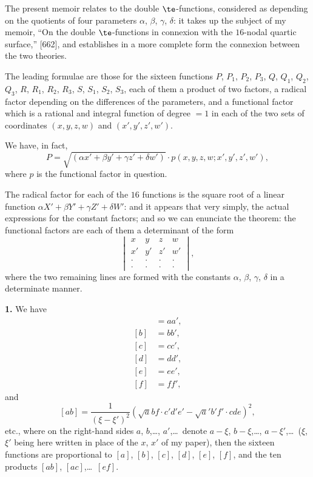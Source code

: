 \documentclass[11pt,a4paper]{book}
\begin{document}
\medskip

The present memoir relates to the double $\te$-functions, considered as depending on the quotients of four parameters $\alpha$, $\beta$, $\gamma$, $\delta$: it takes up the subject of my memoir, ``On the double $\te$-functions in connexion with the $16$-nodal quartic surface,'' [662], and establishes in a more complete form the connexion between the two theories.

The leading formulae are those for the sixteen functions $P$, $P_1$, $P_2$, $P_3$, $Q$, $Q_1$, $Q_2$, $Q_3$, $R$, $R_1$, $R_2$, $R_3$, $S$, $S_1$, $S_2$, $S_3$, each of them a product of two factors, a radical factor depending on the differences of the parameters, and a functional factor which is a rational and integral function of degree $= 1$ in each of the two sets of coordinates $(x, y, z, w)$ and $(x', y', z', w')$.

We have, in fact,
\[
P = \sqrt{(\alpha x' + \beta y' + \gamma z' + \delta w')} \cdot p(x, y, z, w; x', y', z', w'),
\]
where $p$ is the functional factor in question.

The radical factor for each of the $16$ functions is the square root of a linear function $\alpha X' + \beta Y' + \gamma Z' + \delta W'$: and it appears that very simply, the actual expressions for the constant factors; and so we can enunciate the theorem: the functional factors are each of them a determinant of the form
\[
\begin{vmatrix}
x & y & z & w \\
x' & y' & z' & w' \\
\cdot & \cdot & \cdot & \cdot \\
\cdot & \cdot & \cdot & \cdot
\end{vmatrix},
\]
where the two remaining lines are formed with the constants $\alpha$, $\beta$, $\gamma$, $\delta$ in a determinate manner.

\smallskip

\noindent\textbf{1.} We have
\begin{align*}
[a] &= aa', \\
[b] &= bb', \\
[c] &= cc', \\
[d] &= dd', \\
[e] &= ee', \\
[f] &= ff',
\end{align*}
and
\[
[ab] = \frac{1}{(\xi - \xi')^2} (\surd abf \cdot c'd'e' - \surd a'b'f' \cdot cde)^2,
\]
etc., where on the right-hand sides $a$, $b$,\ldots, $a'$,\ldots\ denote $a - \xi$, $b - \xi$,\ldots, $a - \xi'$,\ldots\ ($\xi$, $\xi'$ being here written in place of the $x$, $x'$ of my paper), then the sixteen functions are proportional to $[a]$, $[b]$, $[c]$, $[d]$, $[e]$, $[f]$, and the ten products $[ab]$, $[ac]$,\ldots\ $[ef]$.
\end{document}

